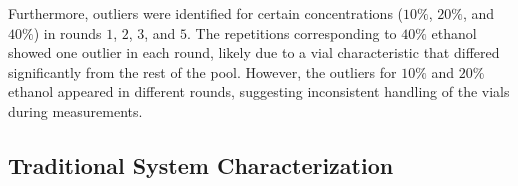 \documentclass[journal,twoside,web]{ieeecolor}
\begin{document}
Furthermore, outliers were identified for certain concentrations ($10\%$, $20\%$, and $40\%$) in rounds $1$, $2$, $3$, and $5$. The repetitions corresponding to $40\%$ ethanol showed one outlier in each round, likely due to a vial characteristic that differed significantly from the rest of the pool. However, the outliers for $10\%$ and $20\%$ ethanol appeared in different rounds, suggesting inconsistent handling of the vials during measurements.

\subsection{Traditional System Characterization}
\label{ssec:sysCharac}
\begin{figure}[!t]
	\centering

\end{figure}
\end{document}
